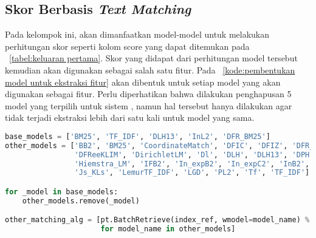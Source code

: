 \subsection{Skor Berbasis \textit{Text Matching}}
\label{subbab:4:Ekstraksi Fitur:Text Matching Score}

Pada kelompok ini, akan dimanfaatkan model-model \base{} \retriever{} untuk melakukan perhitungan skor seperti kolom score yang dapat ditemukan pada \tabel{}~\ref{tabel:keluaran pertama}. Skor yang didapat dari perhitungan model tersebut kemudian akan digunakan sebagai salah satu fitur. Pada \kode{}~\ref{kode:pembentukan model untuk ekstraksi fitur} akan dibentuk \pipeline{} untuk setiap model \base{} \retriever{} yang akan digunakan sebagai fitur. Perlu diperhatikan bahwa dilakukan penghapusan 5 model \base{} \retriever{} yang terpilih untuk sistem \ir{}, namun hal tersebut hanya dilakukan agar tidak terjadi ekstraksi lebih dari satu kali untuk model yang sama.
\begin{lstlisting}[language=Python, caption={\Pipeline{} ekstraksi fitur skor \base{} \retriever{}}, label={kode:pembentukan model untuk ekstraksi fitur}]
base_models = ['BM25', 'TF_IDF', 'DLH13', 'InL2', 'DFR_BM25']
other_models = ['BB2', 'BM25', 'CoordinateMatch', 'DFIC', 'DFIZ', 'DFR_BM25', 'DFRee',
                'DFReeKLIM', 'DirichletLM', 'Dl', 'DLH', 'DLH13', 'DPH', 'XSqrA_M',
                'Hiemstra_LM', 'IFB2', 'In_expB2', 'In_expC2', 'InB2', 'InL2',
                'Js_KLs', 'LemurTF_IDF', 'LGD', 'PL2', 'Tf', 'TF_IDF']

for _model in base_models:
    other_models.remove(_model) 

other_matching_alg = [pt.BatchRetrieve(index_ref, wmodel=model_name) % cut_off
                      for model_name in other_models]
\end{lstlisting}

